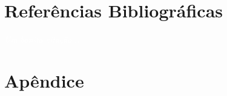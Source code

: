 \documentclass[11pt,fleqn]{book} %
\begin{document}
\chapter*{Referências Bibliográficas}\label{referencias}
\vspace{6em}
\begin{flushright}
	\textit{\textcolor{white}{Um bonita citação...}}
\end{flushright}
\vspace{12em}
\printbibliography[heading=bibempty]



%


\chapter{Apêndice}\label{apendice}
\vspace{6em}
\begin{flushright}
	\textit{\textcolor{white}{}}
\end{flushright}
\vspace{12em}
\end{document}
